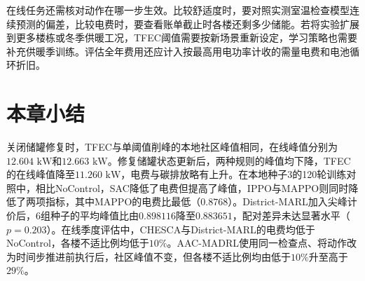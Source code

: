 在线任务还需核对动作在哪一步生效。比较舒适度时，要对照实测室温检查模型连续预测的偏差，比较电费时，要查看账单截止时各楼还剩多少储能。若将实验扩展到更多楼栋或冬季供暖工况，TFEC阈值需要按新场景重新设定，学习策略也需要补充供暖季训练。评估全年费用还应计入按最高用电功率计收的需量电费和电池循环折旧。

\section{本章小结}
关闭储罐修复时，TFEC与单阈值削峰的本地社区峰值相同，在线峰值分别为$12.604\text{ kW}$和$12.663\text{ kW}$。修复储罐状态更新后，两种规则的峰值均下降，TFEC的在线峰值降至$11.260\text{ kW}$，电费与碳排放略有上升。在本地种子3的120轮训练对照中，相比NoControl，SAC降低了电费但提高了峰值，IPPO与MAPPO则同时降低了两项指标，其中MAPPO的电费比最低（$0.8768$）。District-MARL加入尖峰计价后，6组种子的平均峰值比由$0.898116$降至$0.883651$，配对差异未达显著水平（$p=0.203$）。在线季度评估中，CHESCA与District-MARL的电费均低于NoControl，各楼不适比例均低于$10\%$。AAC-MADRL使用同一检查点、将动作改为时间步推进前执行后，社区峰值不变，但各楼不适比例均由低于$10\%$升至高于$29\%$。
